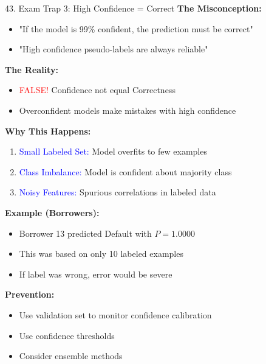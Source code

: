 \documentclass[8pt]{beamer}
\begin{document}
	\begin{frame}{43. Exam Trap 3: High Confidence = Correct}
		\fontsize{6.5}{7.5}\selectfont
		\textbf{The Misconception:}
		\begin{itemize}
			\item "If the model is 99\% confident, the prediction must be correct"
			\item "High confidence pseudo-labels are always reliable"
		\end{itemize}
		
		\textbf{The Reality:}
		\begin{itemize}
			\item \textcolor{red}{FALSE!} Confidence  not equal Correctness
			\item Overconfident models make mistakes with high confidence
		\end{itemize}
		
		\textbf{Why This Happens:}
		\begin{enumerate}
			\item \textcolor{blue}{Small Labeled Set:} Model overfits to few examples
			\item \textcolor{blue}{Class Imbalance:} Model is confident about majority class
			\item \textcolor{blue}{Noisy Features:} Spurious correlations in labeled data
		\end{enumerate}
		
		\textbf{Example (Borrowers):}
		\begin{itemize}
			\item Borrower 13 predicted Default with $P=1.0000$
			\item This was based on only 10 labeled examples
			\item If label was wrong, error would be severe
		\end{itemize}
		
		\textbf{Prevention:}
		\begin{itemize}
			\item Use validation set to monitor confidence calibration
			\item Use confidence thresholds
			\item Consider ensemble methods
		\end{itemize}
	\end{frame}
	
\end{document}
